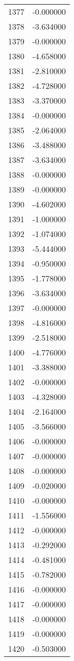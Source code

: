\documentclass[12pt]{article}
\begin{document}
\begin{longtable}{@{}cc@{}}
1377 & -0.000000 \\
1378 & -3.634000 \\
1379 & -0.000000 \\
1380 & -4.658000 \\
1381 & -2.810000 \\
1382 & -4.728000 \\
1383 & -3.370000 \\
1384 & -0.000000 \\
1385 & -2.064000 \\
1386 & -3.488000 \\
1387 & -3.634000 \\
1388 & -0.000000 \\
1389 & -0.000000 \\
1390 & -4.602000 \\
1391 & -1.000000 \\
1392 & -1.074000 \\
1393 & -5.444000 \\
1394 & -0.950000 \\
1395 & -1.778000 \\
1396 & -3.634000 \\
1397 & -0.000000 \\
1398 & -4.816000 \\
1399 & -2.518000 \\
1400 & -4.776000 \\
1401 & -3.388000 \\
1402 & -0.000000 \\
1403 & -4.328000 \\
1404 & -2.164000 \\
1405 & -3.566000 \\
1406 & -0.000000 \\
1407 & -0.000000 \\
1408 & -0.000000 \\
1409 & -0.020000 \\
1410 & -0.000000 \\
1411 & -1.556000 \\
1412 & -0.000000 \\
1413 & -0.292000 \\
1414 & -0.481000 \\
1415 & -0.782000 \\
1416 & -0.000000 \\
1417 & -0.000000 \\
1418 & -0.000000 \\
1419 & -0.000000 \\
1420 & -0.503000 \\

\end{longtable}
\end{document}
